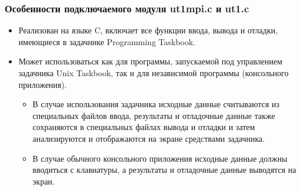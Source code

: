 \begin{frame}
\frametitle{Особенности подключаемого модуля ut1mpi.c и ut1.c}


\begin{itemize}
\item Реализован на языке C, включает все функции ввода, вывода и отладки, имеющиеся в задачнике Programming Taskbook.
\item Может использоваться как для программы, запускаемой под управлением задачника Unix Taskbook, так и для независимой программы (консольного приложения).
\begin{itemize}
    \item В случае использования задачника исходные данные считываются из специальных файлов ввода, результаты и отладочные данные также сохраняются в специальных файлах вывода и отладки и затем анализируются и отображаются на экране средствами задачника.
    \item В случае обычного консольного приложения исходные данные должны вводиться с клавиатуры, а результаты и отладочные данные выводятся на экран.
\end{itemize}
\end{itemize}


\end{frame}


